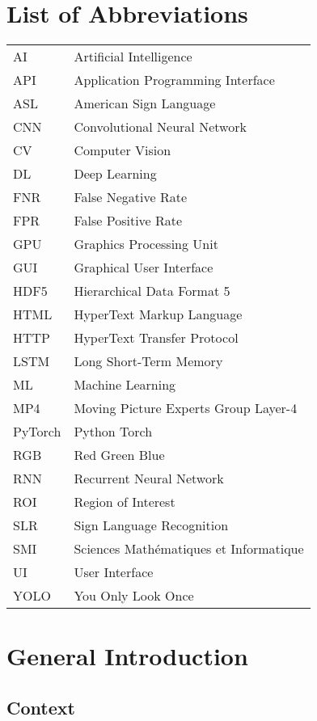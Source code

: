 \documentclass[11pt, a4paper]{article}
\begin{document}
\section*{List of Abbreviations}
\begin{tabular}{ll}
AI & Artificial Intelligence \\
API & Application Programming Interface \\
ASL & American Sign Language \\
CNN & Convolutional Neural Network \\
CV & Computer Vision \\
DL & Deep Learning \\
FNR & False Negative Rate \\
FPR & False Positive Rate \\
GPU & Graphics Processing Unit \\
GUI & Graphical User Interface \\
HDF5 & Hierarchical Data Format 5 \\
HTML & HyperText Markup Language \\
HTTP & HyperText Transfer Protocol \\
LSTM & Long Short-Term Memory \\
ML & Machine Learning \\
MP4 & Moving Picture Experts Group Layer-4 \\
PyTorch & Python Torch \\
RGB & Red Green Blue \\
RNN & Recurrent Neural Network \\
ROI & Region of Interest \\
SLR & Sign Language Recognition \\
SMI & Sciences Mathématiques et Informatique \\
UI & User Interface \\
YOLO & You Only Look Once \\
\end{tabular}
\newpage


\section{General Introduction}

\subsection{Context}
\end{document}
